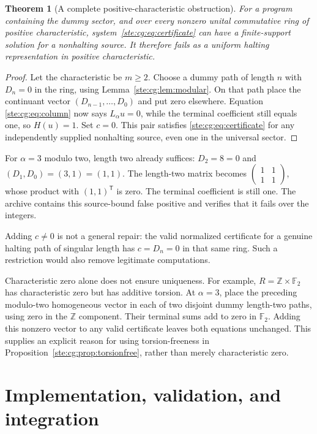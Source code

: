 \documentclass[11pt,letterpaper]{article}
\newtheorem{theorem}{Theorem}[section]
\theoremstyle{definition}
\theoremstyle{remark}
\newcommand{\Z}{\mathbb Z}
\newcommand{\F}{\mathbb F}
\begin{document}
\begin{theorem}[A complete positive-characteristic obstruction]
\label{ste:cg:thm:modular}
For a program containing the dummy sector, and over every nonzero unital
commutative ring of positive characteristic, system~\eqref{ste:cg:eq:certificate}
can have a finite-support solution for a nonhalting source. It therefore
fails as a uniform halting representation in positive characteristic.
\end{theorem}
\begin{proof}
Let the characteristic be $m\ge2$. Choose a dummy path of length $n$ with
$D_n=0$ in the ring, using Lemma~\ref{ste:cg:lem:modular}. On that path place the
continuant vector $(D_{n-1},\ldots,D_0)$ and put zero elsewhere. Equation
\eqref{ste:cg:eq:column} now says $L_\alpha u=0$, while the terminal coefficient
still equals one, so $H(u)=1$. Set $c=0$. This pair satisfies
\eqref{ste:cg:eq:certificate} for any independently supplied nonhalting source,
even one in the universal sector.
\end{proof}

For $\alpha=3$ modulo two, length two already suffices:
$D_2=8=0$ and $(D_1,D_0)=(3,1)=(1,1)$.
The length-two matrix becomes
$\left(\begin{smallmatrix}1&1\\1&1\end{smallmatrix}\right)$,
whose product with $(1,1)^{\mathsf T}$ is zero. The terminal coefficient
is still one. The archive contains this source-bound false positive and
verifies that it fails over the integers.

Adding $c\ne0$ is not a general repair: the valid normalized certificate
for a genuine halting path of singular length has $c=D_n=0$ in that same
ring. Such a restriction would also remove legitimate computations.

Characteristic zero alone does not ensure uniqueness. For example,
$R=\Z\times\F_2$ has characteristic zero but has additive torsion. At
$\alpha=3$, place the preceding modulo-two homogeneous vector in each
of two disjoint dummy length-two paths, using zero in the $\Z$ component.
Their terminal sums add to zero in $\F_2$. Adding this nonzero vector to
any valid certificate leaves both equations unchanged. This supplies an
explicit reason for using torsion-freeness in
Proposition~\ref{ste:cg:prop:torsionfree}, rather than merely characteristic zero.

\section{Implementation, validation, and integration}\label{ste:cg:sec:implementation}
\end{document}
